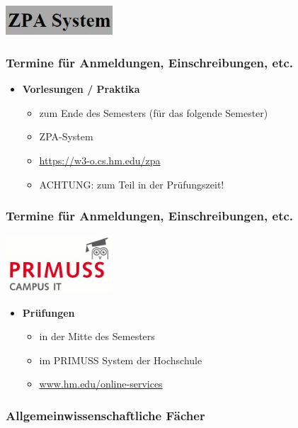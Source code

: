 \documentclass{beamer}
\begin{document}
    \begin{frame}
    	\flushright
    	\includegraphics[width=0.3\textwidth]{zpa.jpg}
    	\frametitle{Termine für Anmeldungen, Einschreibungen, etc.}
    	\begin{itemize}
    		\item \textbf{Vorlesungen / Praktika}
    		\begin{itemize}
    			\item zum Ende des Semesters (für das folgende Semester)
    			\item ZPA-System
    			\item \url{https://w3-o.cs.hm.edu/zpa}
    			\item ACHTUNG: zum Teil in der Prüfungszeit!
    		\end{itemize}
    	\end{itemize}
    \end{frame}
    
    \begin{frame}
    	\frametitle{Termine für Anmeldungen, Einschreibungen, etc.}
    	\flushright
    	\includegraphics[width=0.3\textwidth]{primuss.jpg}
    	\begin{itemize}
    		\item \textbf{Prüfungen}
    		\begin{itemize}
    			\item in der Mitte des Semesters
    			\item im PRIMUSS System der Hochschule
    			\item \url{www.hm.edu/online-services}
    		\end{itemize}
    	\end{itemize}
    \end{frame}
    
     \begin{frame}
         \frametitle{Allgemeinwissenschaftliche Fächer}
         
     \end{frame}
    
    
    
\end{document}
